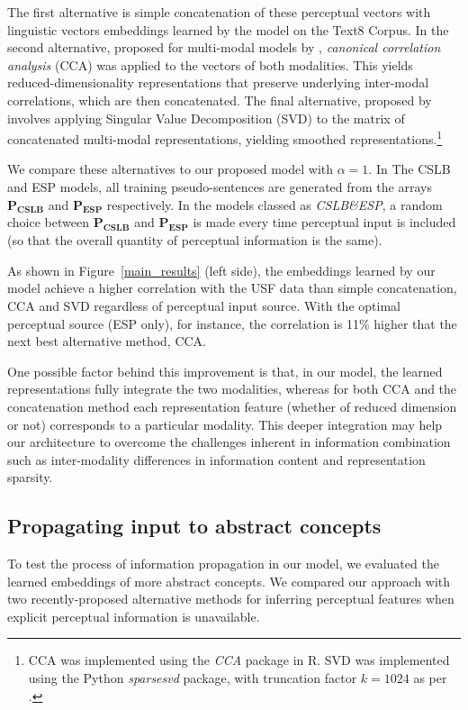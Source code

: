The first alternative is simple concatenation of these perceptual vectors with linguistic vectors embeddings learned by the \cite{mikolov2013efficient} model on the Text8 Corpus. In the second alternative, proposed for multi-modal models by \cite{silberer2012grounded}, \emph{canonical correlation analysis} (CCA) \cite{hardoon2004canonical} was applied to the vectors of both modalities. This yields reduced-dimensionality representations that preserve underlying inter-modal correlations, which are then concatenated. The final alternative, proposed by \cite{bruni2014multimodal} involves applying Singular Value Decomposition (SVD) to the matrix of concatenated multi-modal representations, yielding smoothed representations.\footnote{CCA was implemented using the \emph{CCA} package in R. SVD was implemented using the Python \emph{sparsesvd} package, with truncation factor \(k=1024\) as per \cite{bruni2014multimodal}.}



We compare these alternatives to our proposed model with \(\alpha = 1\). In The CSLB and ESP models, all training pseudo-sentences are generated from the arrays \(\mathbf{P_{CSLB}}\) and \(\mathbf{P_{ESP}}\) respectively. In the models classed as \emph{CSLB\&ESP}, a random choice between \(\mathbf{P_{CSLB}}\) and \(\mathbf{P_{ESP}}\) is made every time perceptual input is included (so that the overall quantity of perceptual information is the same). 

As shown in Figure~\ref{main_results} (left side), the embeddings learned by our model achieve a higher correlation with the USF data than simple concatenation, CCA and SVD regardless of perceptual input source. With the optimal perceptual source (ESP only), for instance, the correlation is 11\% higher that the next best alternative method, CCA. 

One possible factor behind this improvement is that, in our model, the learned representations fully integrate the two modalities, whereas for both CCA and the concatenation method each representation feature (whether of reduced dimension or not) corresponds to a particular modality. This deeper integration may help our architecture to overcome the challenges inherent in information combination such as inter-modality differences in information content and representation sparsity.   


\subsection{Propagating input to abstract concepts}To test the process of information propagation in our model, we evaluated the learned embeddings of more abstract concepts. We compared our approach with two recently-proposed alternative methods for inferring perceptual features when explicit perceptual information is unavailable. 

